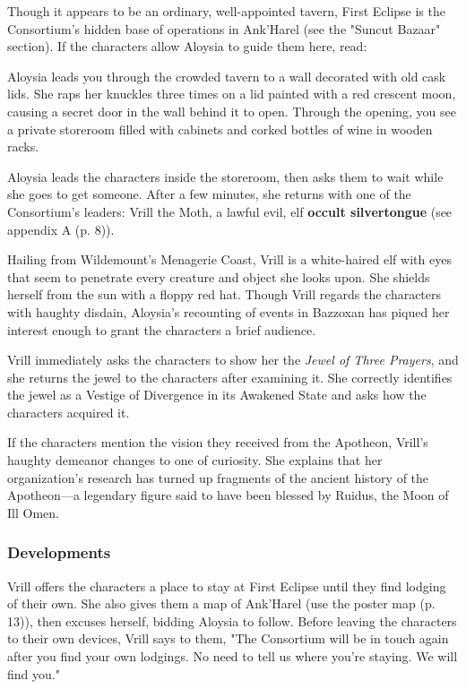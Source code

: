 \documentclass[letterpaper, 11pt, bg=full, twocolumn]{dndbook}
\begin{document}
Though it appears to be an ordinary, well-appointed tavern, First Eclipse is the Consortium's hidden base of operations in Ank'Harel (see the "Suncut Bazaar" section). If the characters allow Aloysia to guide them here, read:

\begin{DndReadAloud}
Aloysia leads you through the crowded tavern to a wall decorated with old cask lids. She raps her knuckles three times on a lid painted with a red crescent moon, causing a secret door in the wall behind it to open. Through the opening, you see a private storeroom filled with cabinets and corked bottles of wine in wooden racks.
\end{DndReadAloud}

Aloysia leads the characters inside the storeroom, then asks them to wait while she goes to get someone. After a few minutes, she returns with one of the Consortium's leaders: Vrill the Moth, a lawful evil, elf \textbf{occult silvertongue} (see appendix A (p. 8)).

Hailing from Wildemount's Menagerie Coast, Vrill is a white-haired elf with eyes that seem to penetrate every creature and object she looks upon. She shields herself from the sun with a floppy red hat. Though Vrill regards the characters with haughty disdain, Aloysia's recounting of events in Bazzoxan has piqued her interest enough to grant the characters a brief audience.

Vrill immediately asks the characters to show her the \textit{Jewel of Three Prayers}, and she returns the jewel to the characters after examining it. She correctly identifies the jewel as a Vestige of Divergence in its Awakened State and asks how the characters acquired it.

If the characters mention the vision they received from the Apotheon, Vrill's haughty demeanor changes to one of curiosity. She explains that her organization's research has turned up fragments of the ancient history of the Apotheon---a legendary figure said to have been blessed by Ruidus, the Moon of Ill Omen.

\subsubsection{Developments}

Vrill offers the characters a place to stay at First Eclipse until they find lodging of their own. She also gives them a map of Ank'Harel (use the poster map (p. 13)), then excuses herself, bidding Aloysia to follow. Before leaving the characters to their own devices, Vrill says to them, "The Consortium will be in touch again after you find your own lodgings. No need to tell us where you're staying. We will find you."
\end{document}
